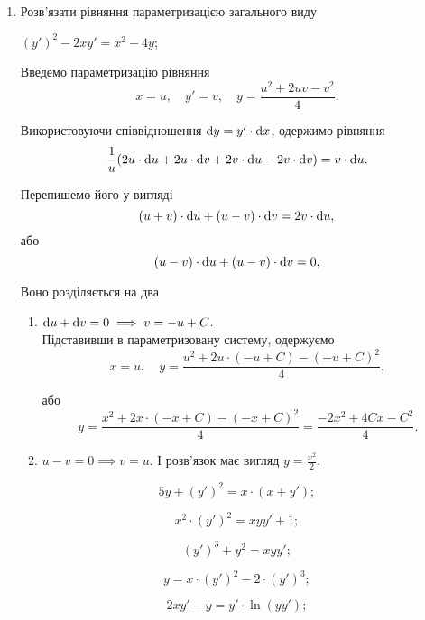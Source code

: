 \begin{enumerate}
	\item Розв'язати рівняння параметризацією загального виду
	\begin{example}
		$(y')^2 - 2 x y' = x^2 - 4y$;
	\end{example}

	\begin{solution}
		Введемо параметризацію рівняння \[x = u, \quad y' = v, \quad y = \frac {u^2 + 2 u v - v^2}{4}.\] 

		Використовуючи співвідношення $\mathop{}\!\mathrm{d} y = y' \cdot \mathop{}\!\mathrm{d} x$, одержимо рівняння
		\[ \frac1u (2u \cdot \mathop{}\!\mathrm{d} u + 2 u \cdot \mathop{}\!\mathrm{d} v + 2 v \cdot \mathop{}\!\mathrm{d} u - 2 v \cdot \mathop{}\!\mathrm{d} v) = v \cdot \mathop{}\!\mathrm{d} u.\]

		Перепишемо його у вигляді \[ (u+v)\cdot\mathop{}\!\mathrm{d} u+(u-v)\cdot\mathop{}\!\mathrm{d} v=2v\cdot\mathop{}\!\mathrm{d} u,\] або \[ (u-v)\cdot\mathop{}\!\mathrm{d} u+(u-v)\cdot\mathop{}\!\mathrm{d} v=0,\]
	
		Воно розділяється на два 
		\begin{enumerate}
			\item $\mathop{}\!\mathrm{d} u + \mathop{}\!\mathrm{d} v = 0 \implies v = - u + C$. \\

			Підставивши в параметризовану систему, одержуємо \[x = u, \quad y = \frac{u^2+2u\cdot(-u+C)-(-u+C)^2}{4},\]

			 або \[y = \frac{x^2+2x\cdot(-x+C)-(-x+C)^2}{4} = \frac{-2x^2+4Cx-C^2}{4}.\]

			\item $u - v = 0 \implies v = u$. І розв'язок має вигляд $y = \frac{x^2}{2}$.
		\end{enumerate}
	\end{solution}

	\begin{multicols}{2}
		\begin{problem}
			\[5y+(y')^2=x\cdot(x+y');\]
		\end{problem}

		\begin{problem}
			\[x^2\cdot(y')^2=xyy'+1;\]
		\end{problem}

		\begin{problem}
			\[(y')^3+y^2=xyy';\]
		\end{problem}

		\begin{problem}
			\[y=x\cdot(y')^2-2\cdot(y')^3;\]
		\end{problem}

		\begin{problem}
			\[2xy'-y=y'\cdot\ln(yy');\]
		\end{problem}


\end{multicols}
\end{enumerate}
